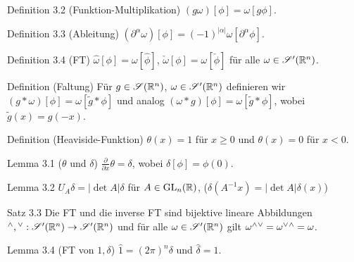 \begin{namedtheorem}{Definition 3.2 (Funktion-Multiplikation)}
  $(g\omega)[\phi]=\omega[g\phi]$.
\end{namedtheorem}

\begin{namedtheorem}{Definition 3.3 (Ableitung)}
  $(\partial^{\alpha}\omega)[\phi]=(-1)^{|\alpha|}\omega[\partial^{\alpha}\phi]$.
\end{namedtheorem}

\begin{namedtheorem}{Definition 3.4 (FT)}
  $\hat{\omega}[\phi] = \omega[\hat{\phi}]$, $\check{\omega}[\phi] = \omega[\check{\phi}]$ für alle $\omega\in\mathscr{S}'(\mathbb{R}^n)$.
\end{namedtheorem}

\begin{namedtheorem}{Definition (Faltung)}
  Für $g\in\mathscr{S}(\mathbb{R}^n)$, $\omega\in\mathscr{S}'(\mathbb{R}^n)$ definieren wir $(g\ast\omega)[\phi]=\omega[\tilde{g}\ast\phi]$ und analog $(\omega\ast g)[\phi]=\omega[\tilde{g}\ast\phi]$, wobei $\tilde{g}(x) = g(-x)$.
\end{namedtheorem}

\begin{namedtheorem}{Definition (Heaviside-Funktion)}
$\theta(x) = 1$ für $x\geq0$ und $\theta(x)=0$ für $x<0$.
\end{namedtheorem}

\begin{namedtheorem}{Lemma 3.1 ($\theta$ und $\delta$)}
  $\frac{\partial}{\partial x}\theta=\delta$, wobei $\delta[\phi]=\phi(0)$.
\end{namedtheorem}

\begin{namedtheorem}{Lemma 3.2}
  $U_A\delta = |\det A|\delta$ für $A\in\mathrm{GL}_n(\mathbb{R})$, ($\delta(A^{-1}x)=|\det A|\delta(x)$)
\end{namedtheorem}

\begin{namedtheorem}{Satz 3.3}
  Die FT und die inverse FT sind bijektive lineare Abbildungen ${}^{\wedge},{}^{\vee}:\mathscr{S}'(\mathbb{R}^n)\rightarrow\mathscr{S}'(\mathbb{R}^n)$ und für alle $\omega\in\mathscr{S}'(\mathbb{R}^n)$ gilt $\omega{}^{\wedge}{}^{\vee} = \omega{}^{\vee}{}^{\wedge} = \omega$.
\end{namedtheorem}

\begin{namedtheorem}{Lemma 3.4 (FT von $1,\delta$)}
  $\hat{1}=(2\pi)^n\delta$ und $\hat{\delta}=1$.
\end{namedtheorem}

